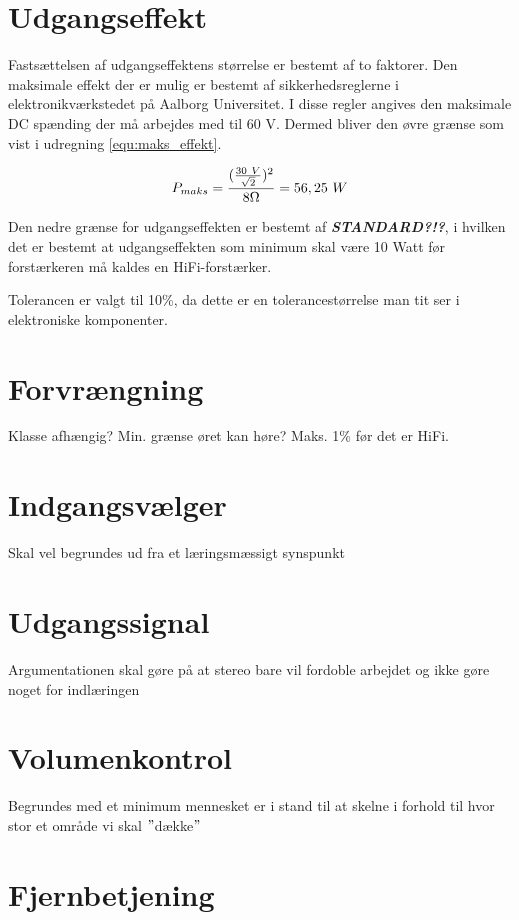 \section{Udgangseffekt}
\label{krav_udgangseffekt}
Fastsættelsen af udgangseffektens størrelse er bestemt af to faktorer. Den maksimale effekt der er mulig er bestemt af sikkerhedsreglerne i elektronikværkstedet på Aalborg Universitet. I disse regler angives den maksimale DC spænding der må arbejdes med til 60 V. Dermed bliver den øvre grænse som vist i udregning \ref{equ:maks_effekt}.

\begin{equation}
\label{equ:maks_effekt}
P_{maks} = \frac{(\frac{30~V}{\sqrt{2}})^2}{8\ohm} = 56,25~W
\end{equation}

Den nedre grænse for udgangseffekten er bestemt af \textbf{\textit{STANDARD?!?}}, i hvilken det er bestemt at udgangseffekten som minimum skal være 10 Watt før forstærkeren må kaldes en HiFi-forstærker.

Tolerancen er valgt til 10\%, da dette er en tolerancestørrelse man tit ser i elektroniske komponenter.

\section{Forvrængning}
\label{krav_forvraengning}
Klasse afhængig? Min. grænse øret kan høre? Maks. 1\% før det er HiFi.

\section{Indgangsvælger}
\label{krav_indgangsvaelger}
Skal vel begrundes ud fra et læringsmæssigt synspunkt

\section{Udgangssignal}
\label{krav_udgangssignal}
Argumentationen skal gøre på at stereo bare vil fordoble arbejdet og ikke gøre noget for indlæringen

\section{Volumenkontrol}
\label{krav_volumenkontrol}
Begrundes med et minimum mennesket er i stand til at skelne i forhold til hvor stor et område vi skal $"$dække$"$

\section{Fjernbetjening}
\label{krav_fjernbetjening}
